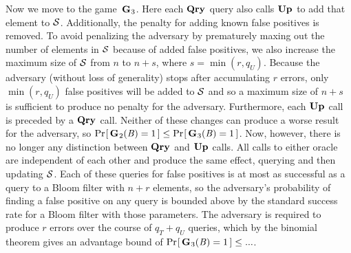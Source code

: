 Now we move to the game~$\textup{\textbf{G}}\hspace{0.5pt}_3$. Here each $\textup{\textbf{Qry}}\hspace{0.5pt}$ query also calls $\textup{\textbf{Up}}\hspace{0.5pt}$ to
add that element to $\mathcal{S}$.   Additionally, the penalty for adding known false
positives is removed. To avoid penalizing the adversary by prematurely maxing
out the number of elements in $\mathcal{S}$ because of added false positives, we also
increase the maximum size of $\mathcal{S}$ from $n$ to $n+s$, where $s = \min(r,q_U)$.
Because the adversary (without loss of generality) stops after accumulating $r$
errors, only $\min(r,q_U)$ false positives will be added to $\mathcal{S}$ and so a
maximum size of $n+s$ is sufficient to produce no penalty for the adversary.
Furthermore, each $\textup{\textbf{Up}}\hspace{0.5pt}$ call is preceded by a $\textup{\textbf{Qry}}\hspace{0.5pt}$ call. Neither of these
changes can produce a worse result for the adversary, so $\Pr\hspace{-1pt}\left[\,\textup{\textbf{G}}\hspace{0.5pt}_2(\mathit{B}) =
1\,\right] \le \Pr\hspace{-1pt}\left[\,\textup{\textbf{G}}\hspace{0.5pt}_3(\mathit{B}) = 1\,\right]$. Now, however, there is no longer any
distinction between $\textup{\textbf{Qry}}\hspace{0.5pt}$ and $\textup{\textbf{Up}}\hspace{0.5pt}$ calls. All calls to either oracle are
independent of each other and produce the same effect, querying and then
updating $\mathcal{S}$. Each of these queries for false positives is at most as
successful as a query to a Bloom filter with $n+r$ elements, so the adversary's
probability of finding a false positive on any query is bounded above by the
standard success rate for a Bloom filter with those parameters. The adversary is
required to produce $r$ errors over the course of $q_T+q_U$ queries, which by
the binomial theorem gives an advantage bound of $\Pr\hspace{-1pt}\left[\,\textup{\textbf{G}}\hspace{0.5pt}_3(\mathit{B}) = 1\,\right] \leq
...$.
%

